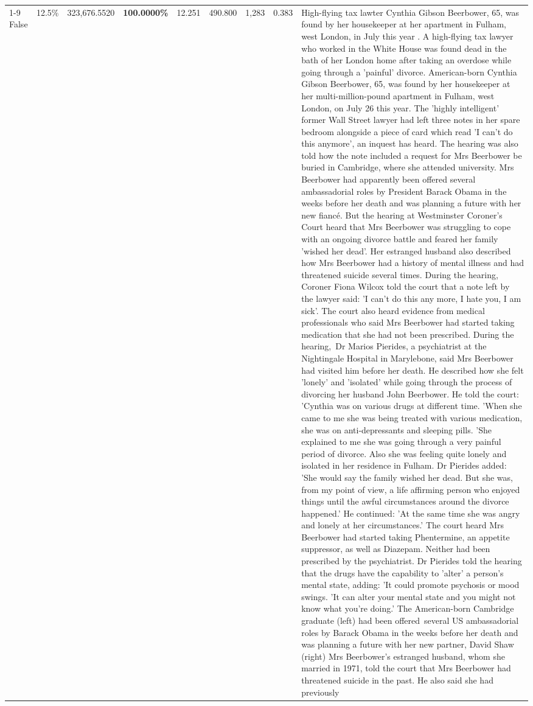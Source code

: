 \begin{table}[H]
\begin{tabular}{lllrlllll}
\cline{1-9}
False & 12.5\% & 323,676.5520 & \bfseries \color{red} 100.0000\% & 12.251 & 490.800 & 1,283 & 0.383 & High-flying tax lawter Cynthia Gibson Beerbower, 65, was found by her housekeeper at her apartment in Fulham, west London, in July this year . A high-flying tax lawyer who worked in the White House was found dead in the bath of her London home after taking an overdose while going through a 'painful' divorce. American-born Cynthia Gibson Beerbower, 65, was found by her housekeeper at her multi-million-pound apartment in Fulham, west London, on July 26 this year. The 'highly intelligent' former Wall Street lawyer had left three notes in her spare bedroom alongside a piece of card which read 'I can't do this anymore', an inquest has heard. The hearing was also told how the note included a request for Mrs Beerbower be buried in Cambridge, where she attended university. Mrs Beerbower had apparently been offered several ambassadorial roles by President Barack Obama in the weeks before her death and was planning a future with her new fiancé. But the hearing at Westminster Coroner's Court heard that Mrs Beerbower was struggling to cope with an ongoing divorce battle and feared her family 'wished her dead'. Her estranged husband also described how Mrs Beerbower had a history of mental illness and had threatened suicide several times. During the hearing, Coroner Fiona Wilcox told the court that a note left by the lawyer said: 'I can't do this any more, I hate you, I am sick'. The court also heard evidence from medical professionals who said Mrs Beerbower had started taking medication that she had not been prescribed. During the hearing, Dr Marios Pierides, a psychiatrist at the Nightingale Hospital in Marylebone, said Mrs Beerbower had visited him before her death. He described how she felt 'lonely' and 'isolated' while going through the process of divorcing her husband John Beerbower. He told the court: 'Cynthia was on various drugs at different time. 'When she came to me she was being treated with various medication, she was on anti-depressants and sleeping pills. 'She explained to me she was going through a very painful period of divorce. Also she was feeling quite lonely and isolated in her residence in Fulham. Dr Pierides added: 'She would say the family wished her dead. But she was, from my point of view, a life affirming person who enjoyed things until the awful circumstances around the divorce happened.' He continued: 'At the same time she was angry and lonely at her circumstances.' The court heard Mrs Beerbower had started taking Phentermine, an appetite suppressor, as well as Diazepam. Neither had been prescribed by the psychiatrist. Dr Pierides told the hearing that the drugs have the capability to 'alter' a person's mental state, adding: 'It could promote psychosis or mood swings. 'It can alter your mental state and you might not know what you're doing.' The American-born Cambridge graduate (left) had been offered several US ambassadorial roles by Barack Obama in the weeks before her death and was planning a future with her new partner, David Shaw (right) Mrs Beerbower's estranged husband, whom she married in 1971, told the court that Mrs Beerbower had threatened suicide in the past. He also said she had previously 
\end{tabular}
\end{table}
